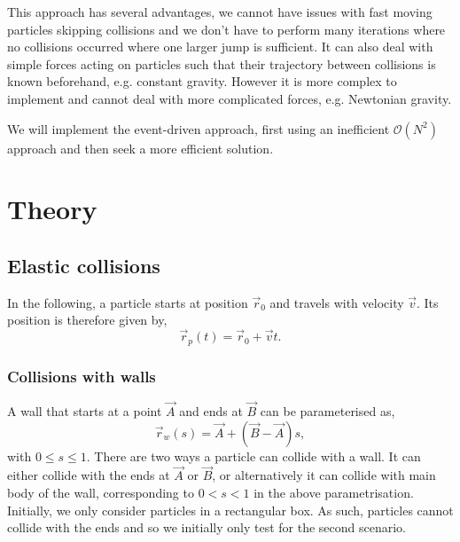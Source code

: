 \documentclass{article}
\begin{document}
This approach has several advantages, we cannot have issues with fast moving particles skipping collisions and we don't have to perform many iterations where no collisions occurred where one larger jump is sufficient. It can also deal with simple forces acting on particles such that their trajectory between collisions is known beforehand, e.g. constant gravity. However it is more complex to implement and cannot deal with more complicated forces, e.g. Newtonian gravity.

We will implement the event-driven approach, first using an inefficient $\mathcal{O}(N^2)$ approach and then seek a more efficient solution.

\section{Theory}

\subsection{Elastic collisions}
In the following, a particle starts at position $\vec{r}_0$ and travels with velocity $\vec{v}$. Its position is therefore given by,
\begin{equation}
    \vec{r}_p(t)
    =
    \vec{r}_0 + \vec{v}t.
\end{equation}

\subsubsection{Collisions with walls}
A wall that starts at a point $\vec{A}$ and ends at $\vec{B}$ can be parameterised as,
\begin{equation}
    \vec{r}_w(s)
    =
    \vec{A} + (\vec{B} - \vec{A}) s,
\end{equation}
with $0 \leq s \leq 1$. There are two ways a particle can collide with a wall. It can either collide with the ends at $\vec{A}$ or $\vec{B}$, or alternatively it can collide with main body of the wall, corresponding to $0 < s < 1$ in the above parametrisation. Initially, we only consider particles in a rectangular box. As such, particles cannot collide with the ends and so we initially only test for the second scenario.
\end{document}

